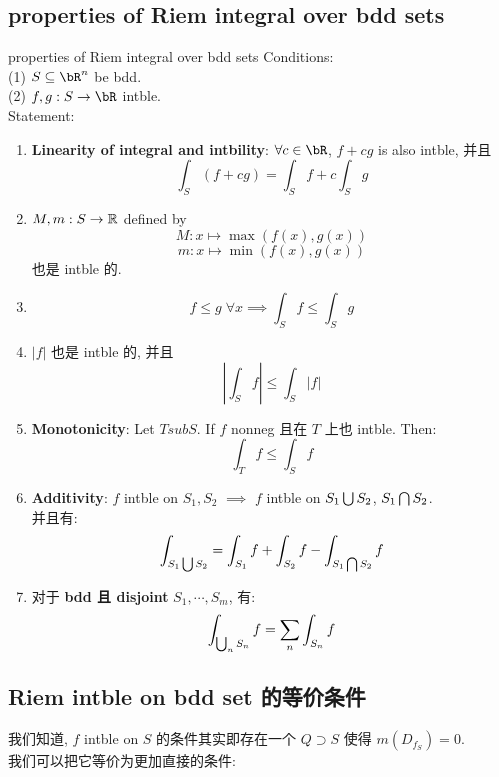 \documentclass[lang=cn,11pt]{elegantbook}
\begin{document}
\subsection{properties of Riem integral over bdd sets}
\begin{theorem}{properties of Riem integral over bdd sets}
    Conditions:\\
    (1) $S \sub \bR^n$ be bdd.\\
    (2) $f,g: S\rar \bR$ intble.\\
    Statement:
    \begin{enumerate}
        \item \textbf{Linearity of integral and intbility}: 
        $\forall c \in \bR$, $f + cg$ is also intble, 并且 
        $$ \int_S (f + cg) = \int_S f + c \int_S g$$
        \item 
        $M,m: S \rightarrow \mathbb{R} $ defined by 
        $$
        M: x \mapsto \max{(f(x), g(x))}
        $$
        $$
        m: x \mapsto \min{(f(x), g(x))}
        $$
        也是 intble 的.

        \item 
        $$f \leq g \; \forall x \implies \int_S f \leq \int_S g$$

        \item 
        $|f|$ 也是 intble 的, 并且 
        $$
        |\int_S f | \leq \int_S |f|
        $$

        \item \textbf{Monotonicity}: Let $T sub S$. If $f$ nonneg 且在 $T$ 上也 intble. Then:
        $$
        \int_T f \leq \int_S f
        $$

        \item \textbf{Additivity}: 
        $f$ intble on $S_1, S_2$ $\implies$ $f$ intble on $S_1 \bigcup S_2$, $S_1 \bigcap S_2$.\\
        并且有:
        $$
        \int_{S_1 \bigcup S_2} = \int_{S_1} f + \int_{S_2} f - \int_{S_1 \bigcap S_2} f
        $$

        \item 对于 \textbf{bdd 且 disjoint} $S_1, \cdots, S_m$, 有:
        $$
        \int_{\bigcup_n S_n} f = \sum_n \int_{S_n} f
        $$
    \end{enumerate}
    
\end{theorem}


\subsection{Riem intble on bdd set 的等价条件}
\begin{remark}
    我们知道, $f$ intble on $S$ 的条件其实即存在一个 $Q \supset S$ 使得 $m(D_{f_S}) = 0$.\\
    我们可以把它等价为更加直接的条件:
\end{remark}
\end{document}

